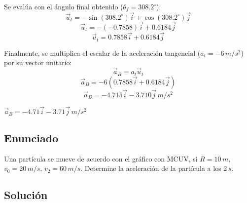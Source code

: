\documentclass[12pt, a4paper]{article}
\begin{document}
Se evalúa con el ángulo final obtenido ($\theta_f = 308.2^\circ$):
$$ \vec{u}_t = -\sin(308.2^\circ)\vec{i} + \cos(308.2^\circ)\vec{j} $$
$$ \vec{u}_t = -(-0.7858)\vec{i} + 0.6184\vec{j} $$
$$ \vec{u}_t = 0.7858\vec{i} + 0.6184\vec{j} $$

Finalmente, se multiplica el escalar de la aceleración tangencial ($a_t = -6 \, \si{m/s^2}$) por su vector unitario:
$$ \vec{a}_B = a_t \vec{u}_t $$
$$ \vec{a}_B = -6(0.7858\vec{i} + 0.6184\vec{j}) $$
$$ \vec{a}_B = -4.715\vec{i} - 3.710\vec{j} \, \si{m/s^2} $$

\begin{tcolorbox}[colback=green!5!white, colframe=green!50!black, title=Respuesta Final]
\centering \Large $\vec{a}_B = -4.71\vec{i} - 3.71\vec{j} \, \si{m/s^2}$
\end{tcolorbox}

\newpage

\subsection*{Enunciado}
Una partícula se mueve de acuerdo con el gráfico con MCUV, si $R = 10 \, \si{m}$, $v_0 = 20 \, \si{m/s}$, $v_2 = 60 \, \si{m/s}$. Determine la aceleración de la partícula a los $2 \, \si{s}$. 

\begin{center}
\end{center}

\subsection*{Solución}
\end{document}
